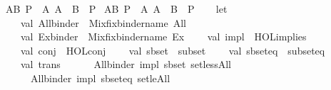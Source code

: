 \begin{isabellebody}
\ {\isachardoublequoteopen}{\isasymexists}A{\isasymsubseteq}B{\isachardot}{\kern0pt}\ P{\isachardoublequoteclose}\ {\isasymrightharpoonup}\ {\isachardoublequoteopen}{\isasymexists}A{\isachardot}{\kern0pt}\ A\ {\isasymsubseteq}\ B\ {\isasymand}\ P{\isachardoublequoteclose}\isanewline
\ {\isachardoublequoteopen}{\isasymexists}{\isacharbang}{\kern0pt}A{\isasymsubseteq}B{\isachardot}{\kern0pt}\ P{\isachardoublequoteclose}\ {\isasymrightharpoonup}\ {\isachardoublequoteopen}{\isasymexists}{\isacharbang}{\kern0pt}A{\isachardot}{\kern0pt}\ A\ {\isasymsubseteq}\ B\ {\isasymand}\ P{\isachardoublequoteclose}\isanewline
%
\isadelimML
\isanewline
%
\endisadelimML
%
\isatagML
{}\isamarkupfalse%
\ {\isacartoucheopen}\isanewline
\ \ let\isanewline
\ \ \ \ val\ All{\isacharunderscore}{\kern0pt}binder\ {\isacharequal}{\kern0pt}\ Mixfix{\isachardot}{\kern0pt}binder{\isacharunderscore}{\kern0pt}name\ \isactrlconstUNDERSCOREsyntax {\isasymopen}All{\isasymclose}{\isacharsemicolon}{\kern0pt}\isanewline
\ \ \ \ val\ Ex{\isacharunderscore}{\kern0pt}binder\ {\isacharequal}{\kern0pt}\ Mixfix{\isachardot}{\kern0pt}binder{\isacharunderscore}{\kern0pt}name\ \isactrlconstUNDERSCOREsyntax {\isasymopen}Ex{\isasymclose}{\isacharsemicolon}{\kern0pt}\isanewline
\ \ \ \ val\ impl\ {\isacharequal}{\kern0pt}\ \isactrlconstUNDERSCOREsyntax {\isasymopen}HOL{\isachardot}{\kern0pt}implies{\isasymclose}{\isacharsemicolon}{\kern0pt}\isanewline
\ \ \ \ val\ conj\ {\isacharequal}{\kern0pt}\ \isactrlconstUNDERSCOREsyntax {\isasymopen}HOL{\isachardot}{\kern0pt}conj{\isasymclose}{\isacharsemicolon}{\kern0pt}\isanewline
\ \ \ \ val\ sbset\ {\isacharequal}{\kern0pt}\ \isactrlconstUNDERSCOREsyntax {\isasymopen}subset{\isasymclose}{\isacharsemicolon}{\kern0pt}\isanewline
\ \ \ \ val\ sbset{\isacharunderscore}{\kern0pt}eq\ {\isacharequal}{\kern0pt}\ \isactrlconstUNDERSCOREsyntax {\isasymopen}subset{\isacharunderscore}{\kern0pt}eq{\isasymclose}{\isacharsemicolon}{\kern0pt}\isanewline
\isanewline
\ \ \ \ val\ trans\ {\isacharequal}{\kern0pt}\isanewline
\ \ \ \ \ {\isacharbrackleft}{\kern0pt}{\isacharparenleft}{\kern0pt}{\isacharparenleft}{\kern0pt}All{\isacharunderscore}{\kern0pt}binder{\isacharcomma}{\kern0pt}\ impl{\isacharcomma}{\kern0pt}\ sbset{\isacharparenright}{\kern0pt}{\isacharcomma}{\kern0pt}\ \isactrlsyntaxUNDERSCOREconst {\isasymopen}{\isacharunderscore}{\kern0pt}setlessAll{\isasymclose}{\isacharparenright}{\kern0pt}{\isacharcomma}{\kern0pt}\isanewline
\ \ \ \ \ \ {\isacharparenleft}{\kern0pt}{\isacharparenleft}{\kern0pt}All{\isacharunderscore}{\kern0pt}binder{\isacharcomma}{\kern0pt}\ impl{\isacharcomma}{\kern0pt}\ sbset{\isacharunderscore}{\kern0pt}eq{\isacharparenright}{\kern0pt}{\isacharcomma}{\kern0pt}\ \isactrlsyntaxUNDERSCOREconst {\isasymopen}{\isacharunderscore}{\kern0pt}setleAll{\isasymclose}{\isacharparenright}{\kern0pt}{\isacharcomma}{\kern0pt}\isanewline

\end{isabellebody}
